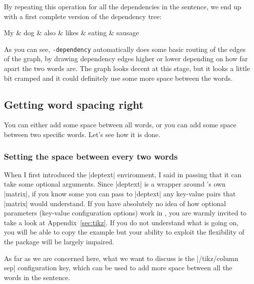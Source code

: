 \documentclass[a4paper]{ltxdoc}
\def\pkgname{\tikzname{}\texttt{-dependency}}
\begin{document}
By repeating this operation for all the dependencies in the sentence, we end up with a first complete version
of the dependency tree:

\begin{codeexample}[]
\begin{dependency}
   \begin{deptext}
      My \& dog \& also \& likes \& eating \& sausage \\
   \end{deptext}
\end{dependency}
\end{codeexample}

As you can see, \pkgname{} automatically does some basic routing of the edges of the graph, by drawing
dependency edges higher or lower depending on how far apart the two words are. The graph looks decent at
this stage, but it looks a little bit cramped and it could definitely use some more space between the words.

\subsection{Getting word spacing right}

You can either add some space between all words, or you can add some space between two specific words. Let's see how it is done.

\subsubsection{Setting the space between every two words}

When I first introduced the |deptext| environment, I said in passing that it can take some optional arguments. Since |deptext| is a wrapper around \tikzname{}'s own |matrix|, if you know some \tikzname{} you can pass to |deptext| any key-value pairs that |matrix| would understand. If you have absolutely no idea of how optional parameters (key-value configuration options) work in \tikzname{}, you are warmly invited to take a look at Appendix~\ref{sec:tikz}. If you do not understand what is going on, you will be able to copy the example but your ability to exploit the flexibility of the package will be largely impaired.

As far as we are concerned here, what we want to discuss is the |/tikz/column sep| configuration key, which can be used to add more space between all the words in the sentence. 
\end{document}
